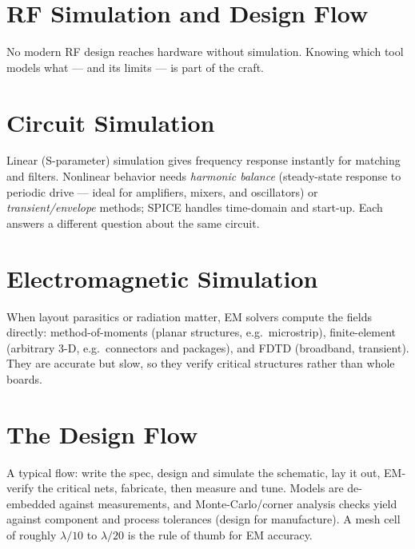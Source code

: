 \section{RF Simulation and Design Flow}\label{sec:tb_cad}



No modern RF design reaches hardware without simulation. Knowing which tool models
what --- and its limits --- is part of the craft.

\section{Circuit Simulation}
Linear (S-parameter) simulation gives frequency response instantly for matching
and filters. Nonlinear behavior needs \emph{harmonic balance} (steady-state
response to periodic drive --- ideal for amplifiers, mixers, and oscillators) or
\emph{transient/envelope} methods; SPICE handles time-domain and start-up. Each
answers a different question about the same circuit.

\section{Electromagnetic Simulation}
When layout parasitics or radiation matter, EM solvers compute the fields
directly: method-of-moments (planar structures, e.g.\ microstrip), finite-element
(arbitrary 3-D, e.g.\ connectors and packages), and FDTD (broadband, transient).
They are accurate but slow, so they verify critical structures rather than whole
boards.

\section{The Design Flow}
A typical flow: write the spec, design and simulate the schematic, lay it out, EM-
verify the critical nets, fabricate, then measure and tune. Models are de-embedded
against measurements, and Monte-Carlo/corner analysis checks yield against
component and process tolerances (design for manufacture). A mesh cell of roughly
$\lambda/10$ to $\lambda/20$ is the rule of thumb for EM accuracy.



